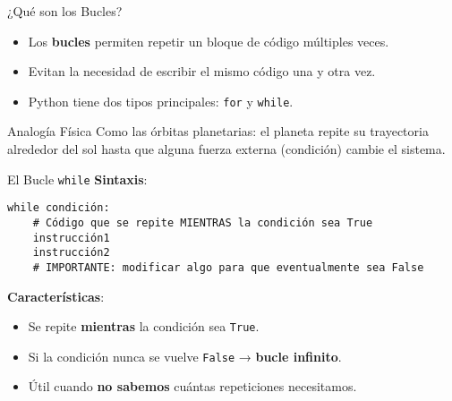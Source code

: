 \documentclass[10pt]{beamer}
\begin{document}
\begin{frame}{¿Qué son los Bucles?}
  \begin{itemize}
    \item Los \textbf{bucles} permiten repetir un bloque de código múltiples veces.
    \item Evitan la necesidad de escribir el mismo código una y otra vez.
    \item Python tiene dos tipos principales: \texttt{for} y \texttt{while}.
  \end{itemize}
  
  \begin{block}{Analogía Física}
    Como las órbitas planetarias: el planeta repite su trayectoria alrededor del sol hasta que alguna fuerza externa (condición) cambie el sistema.
  \end{block}
\end{frame}

\begin{frame}[fragile]{El Bucle \texttt{while}}
  \textbf{Sintaxis}:
  \begin{verbatim}
while condición:
    # Código que se repite MIENTRAS la condición sea True
    instrucción1
    instrucción2
    # IMPORTANTE: modificar algo para que eventualmente sea False
  \end{verbatim}
  
  \textbf{Características}:
  \begin{itemize}
    \item Se repite \textbf{mientras} la condición sea \texttt{True}.
    \item Si la condición nunca se vuelve \texttt{False} → \textbf{bucle infinito}.
    \item Útil cuando \textbf{no sabemos} cuántas repeticiones necesitamos.
  \end{itemize}
\end{frame}
\end{document}
